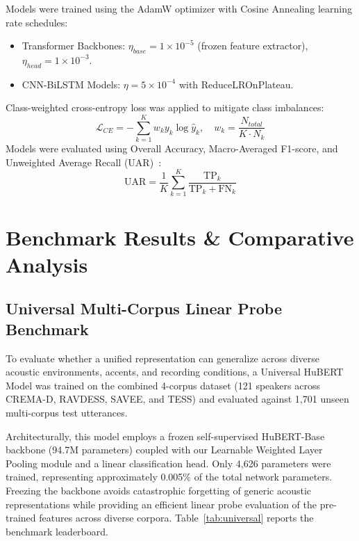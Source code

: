 \documentclass[10pt,journal,compsoc]{IEEEtran}
\begin{document}
Models were trained using the AdamW optimizer with Cosine Annealing learning rate schedules:
\begin{itemize}
    \item Transformer Backbones: $\eta_{base} = 1 \times 10^{-5}$ (frozen feature extractor), $\eta_{head} = 1 \times 10^{-3}$.
    \item CNN-BiLSTM Models: $\eta = 5 \times 10^{-4}$ with ReduceLROnPlateau.
\end{itemize}
Class-weighted cross-entropy loss was applied to mitigate class imbalances:
\begin{equation}
\mathcal{L}_{CE} = - \sum_{k=1}^{K} w_k y_k \log \hat{y}_k, \quad w_k = \frac{N_{total}}{K \cdot N_k}
\end{equation}
Models were evaluated using Overall Accuracy, Macro-Averaged F1-score, and Unweighted Average Recall (UAR)~\cite{schuller2020interspeech}:
\begin{equation}
\text{UAR} = \frac{1}{K} \sum_{k=1}^{K} \frac{\text{TP}_k}{\text{TP}_k + \text{FN}_k}
\end{equation}

\section{Benchmark Results \& Comparative Analysis}
\label{sec:results}

\subsection{Universal Multi-Corpus Linear Probe Benchmark}
To evaluate whether a unified representation can generalize across diverse acoustic environments, accents, and recording conditions, a Universal HuBERT Model was trained on the combined 4-corpus dataset (121 speakers across CREMA-D, RAVDESS, SAVEE, and TESS) and evaluated against 1,701 unseen multi-corpus test utterances. 

Architecturally, this model employs a frozen self-supervised HuBERT-Base backbone (94.7M parameters) coupled with our Learnable Weighted Layer Pooling module and a linear classification head. Only 4,626 parameters were trained, representing approximately 0.005\% of the total network parameters. Freezing the backbone avoids catastrophic forgetting of generic acoustic representations while providing an efficient linear probe evaluation of the pre-trained features across diverse corpora. Table~\ref{tab:universal} reports the benchmark leaderboard.
\end{document}

